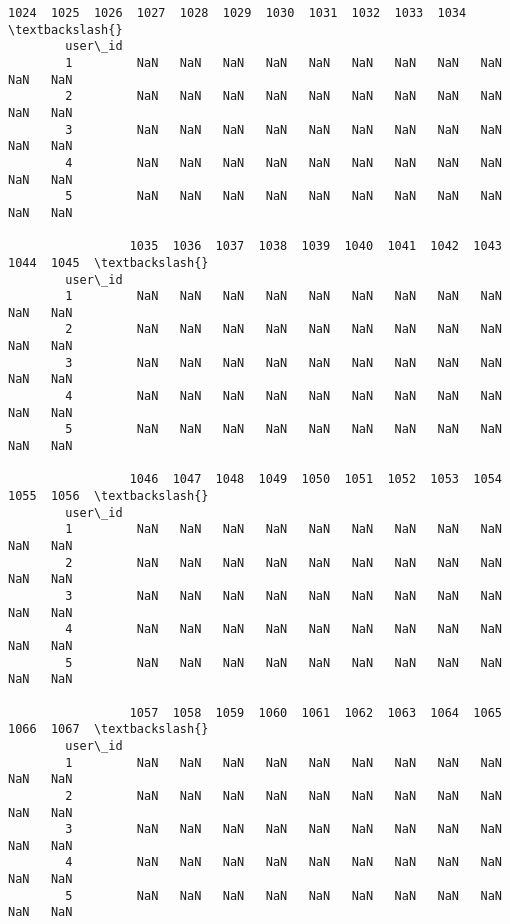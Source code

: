 \documentclass[11pt]{article}
\begin{document}
\begin{Verbatim}[commandchars=\\\{\}]
                 1024  1025  1026  1027  1028  1029  1030  1031  1032  1033  1034  \textbackslash{}
        user\_id                                                                     
        1         NaN   NaN   NaN   NaN   NaN   NaN   NaN   NaN   NaN   NaN   NaN   
        2         NaN   NaN   NaN   NaN   NaN   NaN   NaN   NaN   NaN   NaN   NaN   
        3         NaN   NaN   NaN   NaN   NaN   NaN   NaN   NaN   NaN   NaN   NaN   
        4         NaN   NaN   NaN   NaN   NaN   NaN   NaN   NaN   NaN   NaN   NaN   
        5         NaN   NaN   NaN   NaN   NaN   NaN   NaN   NaN   NaN   NaN   NaN   
        
                 1035  1036  1037  1038  1039  1040  1041  1042  1043  1044  1045  \textbackslash{}
        user\_id                                                                     
        1         NaN   NaN   NaN   NaN   NaN   NaN   NaN   NaN   NaN   NaN   NaN   
        2         NaN   NaN   NaN   NaN   NaN   NaN   NaN   NaN   NaN   NaN   NaN   
        3         NaN   NaN   NaN   NaN   NaN   NaN   NaN   NaN   NaN   NaN   NaN   
        4         NaN   NaN   NaN   NaN   NaN   NaN   NaN   NaN   NaN   NaN   NaN   
        5         NaN   NaN   NaN   NaN   NaN   NaN   NaN   NaN   NaN   NaN   NaN   
        
                 1046  1047  1048  1049  1050  1051  1052  1053  1054  1055  1056  \textbackslash{}
        user\_id                                                                     
        1         NaN   NaN   NaN   NaN   NaN   NaN   NaN   NaN   NaN   NaN   NaN   
        2         NaN   NaN   NaN   NaN   NaN   NaN   NaN   NaN   NaN   NaN   NaN   
        3         NaN   NaN   NaN   NaN   NaN   NaN   NaN   NaN   NaN   NaN   NaN   
        4         NaN   NaN   NaN   NaN   NaN   NaN   NaN   NaN   NaN   NaN   NaN   
        5         NaN   NaN   NaN   NaN   NaN   NaN   NaN   NaN   NaN   NaN   NaN   
        
                 1057  1058  1059  1060  1061  1062  1063  1064  1065  1066  1067  \textbackslash{}
        user\_id                                                                     
        1         NaN   NaN   NaN   NaN   NaN   NaN   NaN   NaN   NaN   NaN   NaN   
        2         NaN   NaN   NaN   NaN   NaN   NaN   NaN   NaN   NaN   NaN   NaN   
        3         NaN   NaN   NaN   NaN   NaN   NaN   NaN   NaN   NaN   NaN   NaN   
        4         NaN   NaN   NaN   NaN   NaN   NaN   NaN   NaN   NaN   NaN   NaN   
        5         NaN   NaN   NaN   NaN   NaN   NaN   NaN   NaN   NaN   NaN   NaN   
        

\end{Verbatim}
\end{document}

